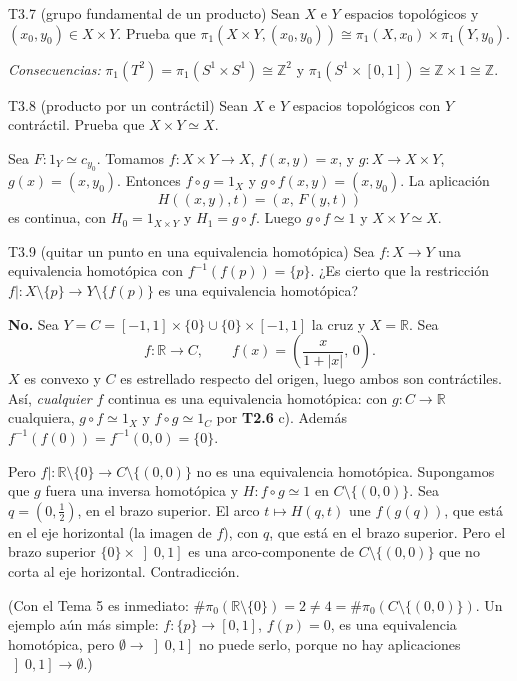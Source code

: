\begin{ejercicio}{T3.7 (grupo fundamental de un producto)}
Sean $X$ e $Y$ espacios topológicos y $(x_0,y_0) \in X \times Y$. Prueba que $\pi_1(X \times Y,(x_0,y_0)) \cong \pi_1(X,x_0) \times \pi_1(Y,y_0)$.


\emph{Consecuencias:} $\pi_1(T^2) = \pi_1(S^1 \times S^1) \cong \mathbb{Z}^2$ y $\pi_1(S^1 \times [0,1]) \cong \mathbb{Z} \times 1 \cong \mathbb{Z}$.
\end{ejercicio}

\begin{ejercicio}{T3.8 (producto por un contráctil)}
Sean $X$ e $Y$ espacios topológicos con $Y$ contráctil. Prueba que $X \times Y \simeq X$.

\sol \fuentepropia

Sea $F \colon 1_Y \simeq c_{y_0}$. Tomamos $f \colon X \times Y \to X$, $f(x,y) = x$, y $g \colon X \to X \times Y$, $g(x) = (x,y_0)$. Entonces $f \circ g = 1_X$ y $g \circ f(x,y) = (x,y_0)$. La aplicación
\[ H((x,y),t) = (x,\, F(y,t)) \]
es continua, con $H_0 = 1_{X \times Y}$ y $H_1 = g \circ f$. Luego $g \circ f \simeq 1$ y $X \times Y \simeq X$.
\end{ejercicio}

\begin{ejercicio}{T3.9 (quitar un punto en una equivalencia homotópica)}
Sea $f \colon X \to Y$ una equivalencia homotópica con $f^{-1}(f(p)) = \{p\}$. ¿Es cierto que la restricción $f| \colon X \setminus \{p\} \to Y \setminus \{f(p)\}$ es una equivalencia homotópica?

\sol \fuentepropia

\textbf{No.} Sea $Y = C = [-1,1] \times \{0\} \cup \{0\} \times [-1,1]$ la cruz y $X = \mathbb{R}$. Sea
\[ f \colon \mathbb{R} \to C, \qquad f(x) = \left(\frac{x}{1+|x|},\, 0\right). \]
$X$ es convexo y $C$ es estrellado respecto del origen, luego ambos son contráctiles. Así, \emph{cualquier} $f$ continua es una equivalencia homotópica: con $g \colon C \to \mathbb{R}$ cualquiera, $g \circ f \simeq 1_X$ y $f \circ g \simeq 1_C$ por \textbf{T2.6} c). Además $f^{-1}(f(0)) = f^{-1}(0,0) = \{0\}$.

Pero $f| \colon \mathbb{R} \setminus \{0\} \to C \setminus \{(0,0)\}$ no es una equivalencia homotópica. Supongamos que $g$ fuera una inversa homotópica y $H \colon f \circ g \simeq 1$ en $C \setminus \{(0,0)\}$. Sea $q = (0,\frac12)$, en el brazo superior. El arco $t \mapsto H(q,t)$ une $f(g(q))$, que está en el eje horizontal (la imagen de $f$), con $q$, que está en el brazo superior. Pero el brazo superior $\{0\} \times \left]0,1\right]$ es una arco-componente de $C \setminus \{(0,0)\}$ que no corta al eje horizontal. Contradicción.

(Con el Tema 5 es inmediato: $\#\pi_0(\mathbb{R} \setminus \{0\}) = 2 \neq 4 = \#\pi_0(C \setminus \{(0,0)\})$. Un ejemplo aún más simple: $f \colon \{p\} \to [0,1]$, $f(p) = 0$, es una equivalencia homotópica, pero $\emptyset \to \left]0,1\right]$ no puede serlo, porque no hay aplicaciones $\left]0,1\right] \to \emptyset$.)
\end{ejercicio}

